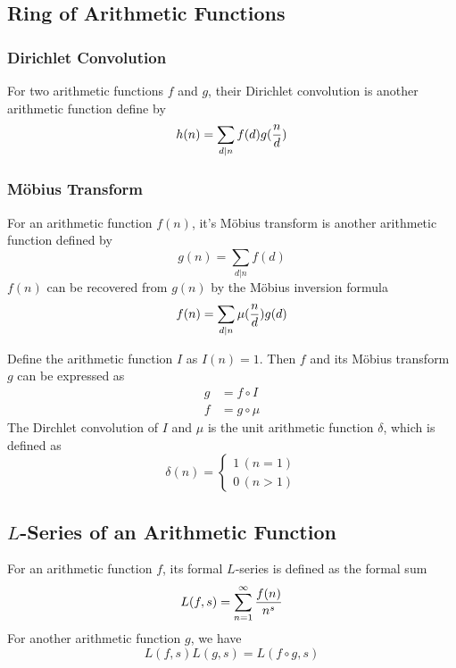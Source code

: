 \documentclass{article}
\begin{document}
\subsection{Ring of Arithmetic Functions}
\subsubsection*{Dirichlet Convolution}
For two arithmetic functions $f$ and $g$, their Dirichlet convolution is another arithmetic function
define by $$h(n) = \sum_{d \vert n} f(d) g({n \over d})$$

\subsubsection*{M\"obius Transform}
For an arithmetic function $f(n)$, it's M\"obius transform is another arithmetic function
defined by $$g(n) = \sum_{d \vert n} f(d)$$
$f(n)$ can be recovered from $g(n)$ by the M\"obius inversion formula
$$f(n) = \sum_{d \vert n} \mu({n \over d}) g(d)$$

Define the arithmetic function $I$ as $I(n) = 1$.
Then $f$ and its M\"obius transform $g$ can be expressed as
\begin{align*}
  g &= f \circ I \\
  f &= g \circ \mu
\end{align*}
The Dirchlet convolution of $I$ and $\mu$ is the unit arithmetic function $\delta$,
which is defined as
\begin{equation*}
  \delta(n) =
  \begin{cases}
    1 \, (n = 1) \\
    0 \, (n > 1)
  \end{cases}
\end{equation*}

\subsection{$L$-Series of an Arithmetic Function}
For an arithmetic function $f$, its formal $L$-series is defined as the formal sum
\begin{equation*}
  L(f, s) = \sum_{n=1}^\infty {f(n) \over n^s}
\end{equation*}
For another arithmetic function $g$, we have
\begin{equation*}
  L(f, s) L(g, s) = L(f \circ g, s)
\end{equation*}
\end{document}
